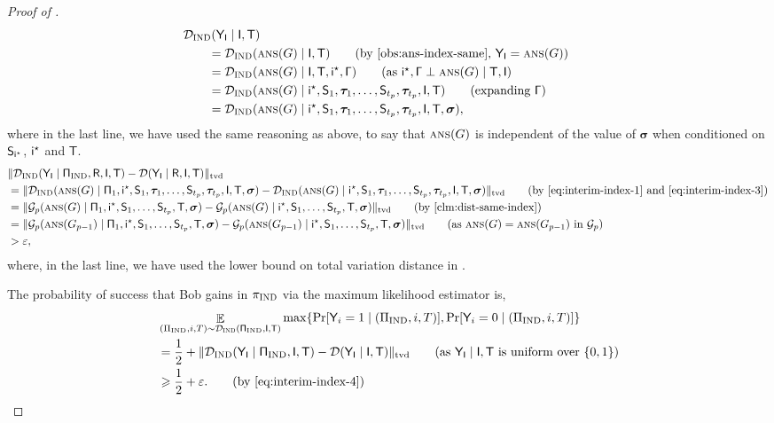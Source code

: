 \documentclass[11pt]{article}
\theoremstyle{definition}
\renewcommand{\geq}{\geqslant}
\newcommand{\tvd}[2]{\ensuremath{\norm{#1 - #2}_{\mathrm{tvd}}}}
\newcommand{\eps}{\ensuremath{\varepsilon}}
\newcommand{\norm}[1]{\ensuremath{\|#1\|}}
\DeclareMathOperator*{\Exp}{\ensuremath{{\mathbb{E}}}}
\DeclareMathOperator*{\Prob}{\ensuremath{\textnormal{Pr}}}
\renewcommand{\Pr}{\Prob}
\newcommand{\rv}[1]{\ensuremath{{\mathsf{#1}}}\xspace}
\newcommand{\rY}{\rv{Y}}
\newcommand{\cG}{\ensuremath{\mathcal{G}}}
\newcommand{\cD}{\ensuremath{\mathcal{D}}}
\newcommand{\ans}{\ensuremath{\textnormal{\textsc{ans}}}}
\newcommand{\prot}{\ensuremath{\pi}}
\newcommand{\Prot}{\ensuremath{\Pi}}
\newcommand{\rProt}{\ensuremath{\rv{\Prot}}}
\newcommand{\rR}{\ensuremath{\rv{R}}}
\newcommand{\rT}{\ensuremath{\rv{T}}}
\newcommand{\rS}{\ensuremath{\rv{S}}}
\newcommand{\protindex}{\ensuremath{\prot_{\textnormal{\textsc{IND}}}}}
\newcommand{\rsigma}{\ensuremath{\bm{\sigma}}}
\begin{document}
\begin{proof}[Proof of ]
	\begin{align}
		&\hspace{-20pt}\cDind(\rY_\rI \mid  \rI, \rT) \notag\\
	 &=\cDind(\ans(G) \mid \rI, \rT) \tag{by \Cref{obs:ans-index-same}, $\rY_\rI = \ans(G)$}\\
	 &= \cDind(\ans(G) \mid \rI, \rT, \ristar, \rGamma) \tag{as $\ristar, \rGamma \perp \ans(G) \mid \rT, \rI$} \\
		&= \cDind(\ans(G) \mid  \ristar, \rS_1, \rtau_1, \ldots, \rS_{t_p},\rtau_{t_p},  \rI, \rT) \tag{expanding $\rGamma$}\\
		&= \cDind(\ans(G) \mid  \ristar, \rS_1, \rtau_1, \ldots, \rS_{t_p},\rtau_{t_p},  \rI, \rT, \rsigma),\label{eq:interim-index-3}
	\end{align}
	where in the last line, we have used the same reasoning as above, to say that $\ans(G)$ is independent of the value of $\rsigma$ when conditioned on $\rS_{\ristar}$, $\ristar$ and $\rT$. 
		\begin{align}
	&\tvd{\cDind(\rY_\rI \mid \rProtIND, \rR, \rI, \rT) }{\cD(\rY_\rI \mid \rR, \rI, \rT) } \notag\\
	&= \tvd{ \cDind(\ans(G) \mid \rProt_1, \ristar, \rS_1, \rtau_1, \ldots, \rS_{t_p},\rtau_{t_p},  \rI, \rT, \rsigma)}{\cDind(\ans(G) \mid  \ristar, \rS_1, \rtau_1, \ldots, \rS_{t_p},\rtau_{t_p},  \rI, \rT, \rsigma)} \tag{by \Cref{eq:interim-index-1} and \Cref{eq:interim-index-3}} \\
	&= \tvd{ \cG_p(\ans(G) \mid \rProt_1, \ristar, \rS_1, \ldots, \rS_{t_p}, \rT, \rsigma)}{\cG_p(\ans(G) \mid  \ristar, \rS_1, \ldots, \rS_{t_p}, \rT, \rsigma)} \tag{by \Cref{clm:dist-same-index}} \\
	&= \tvd{ \cG_p(\ans(G_{p-1}) \mid \rProt_1, \ristar, \rS_1, \ldots, \rS_{t_p}, \rT, \rsigma)}{\cG_p(\ans(G_{p-1}) \mid  \ristar, \rS_1, \ldots, \rS_{t_p}, \rT, \rsigma)} \tag{as $\ans(G) = \ans(G_{p-1})$ in $\cG_p$} \\
	&> \eps, \label{eq:interim-index-4}
	\end{align}
	where, in the last line, we have used the lower bound on total variation distance in .
	
	The probability of success that Bob gains in $\protindex$ via the maximum likelihood estimator is, 
	\begin{align*}
	&\Exp_{(\Prot_{\textnormal{IND}}, i, T) \sim\cDind(\rProtIND, \rI, \rT)}	\max\{\Pr[\rY_i = 1 \mid (\Prot_{\textnormal{IND}}, i, T )], \Pr[\rY_i = 0 \mid (\Prot_{\textnormal{IND}}, i, T )]\} \\
	&= \frac12 + \tvd{\cDind(\rY_\rI \mid \rProtIND,  \rI, \rT)}{\cD(\rY_\rI \mid \rI, \rT)} \tag{as $\rY_\rI \mid  \rI, \rT$ is uniform over $\{0,1\}$} \\
	&\geq \frac12 + \eps. \tag{by \Cref{eq:interim-index-4}}
	\end{align*}


\end{proof}
\end{document}
